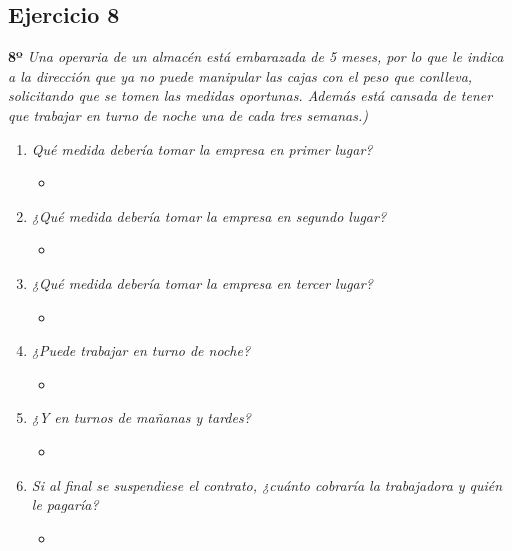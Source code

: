 \documentclass{article}
\begin{document}
        \subsection{Ejercicio 8}
        \textbf{8º} \textit{Una operaria de un almacén está embarazada de 5 meses, por lo que le indica a la dirección que ya no puede manipular las cajas con el peso que conlleva, solicitando que se tomen las medidas 
        oportunas. Además está cansada de tener que trabajar en turno de noche una de cada tres semanas.)}
        \\
        \begin{enumerate}[label=(\alph*)]
          \item \textit{Qué medida debería tomar la empresa en primer lugar?}
            \begin{itemize}
              \item 
            \end{itemize}
          \item \textit{¿Qué medida debería tomar la empresa en segundo lugar?}
            \begin{itemize}
              \item 
            \end{itemize}
          \item \textit{¿Qué medida debería tomar la empresa en tercer lugar?}
            \begin{itemize}
              \item 
            \end{itemize}
          \item \textit{¿Puede trabajar en turno de noche?}
            \begin{itemize}
              \item 
            \end{itemize}
          \item \textit{¿Y en turnos de mañanas y tardes?}
            \begin{itemize}
              \item 
            \end{itemize}
          \item \textit{Si al final se suspendiese el contrato, ¿cuánto cobraría la trabajadora y quién le pagaría?}
            \begin{itemize}
              \item
            \end{itemize}
        \end{enumerate}
      
\end{document}
